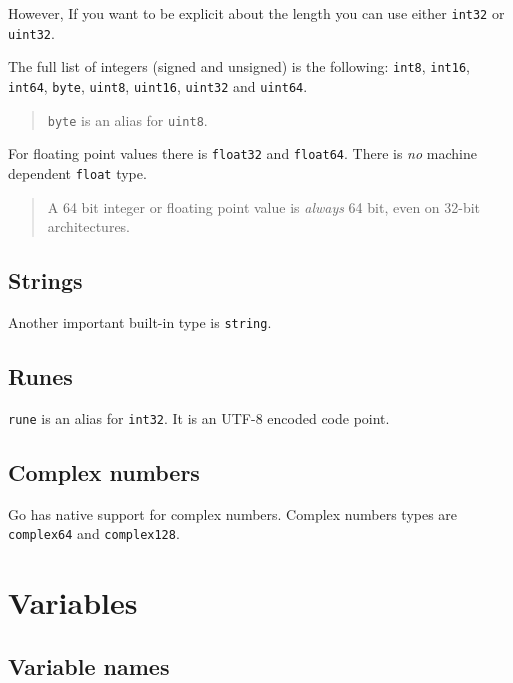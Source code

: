 \documentclass[]{book}
\begin{document}
However, If you want to be explicit about the length you can use either \texttt{int32}
or \texttt{uint32}.

The full list of integers (signed and unsigned) is the following: \texttt{int8},
\texttt{int16}, \texttt{int64}, \texttt{byte}, \texttt{uint8}, \texttt{uint16}, \texttt{uint32} and \texttt{uint64}.

\begin{quote}
\texttt{byte} is an alias for \texttt{uint8}.
\end{quote}

For floating point values there is \texttt{float32} and \texttt{float64}. There is \emph{no}
machine dependent \texttt{float} type.

\begin{quote}
A 64 bit integer or floating point value is \emph{always} 64 bit, even on 32-bit
architectures.
\end{quote}

\hypertarget{strings}{%
\subsection{Strings}\label{strings}}

Another important built-in type is \texttt{string}.

\hypertarget{runes}{%
\subsection{Runes}\label{runes}}

\texttt{rune} is an alias for \texttt{int32}. It is an UTF-8 encoded code point.

\hypertarget{complex-numbers}{%
\subsection{Complex numbers}\label{complex-numbers}}

Go has native support for complex numbers. Complex numbers types are
\texttt{complex64} and \texttt{complex128}.

\hypertarget{variables}{%
\section{Variables}\label{variables}}

\hypertarget{variable-names}{%
\subsection{Variable names}\label{variable-names}}
\end{document}
